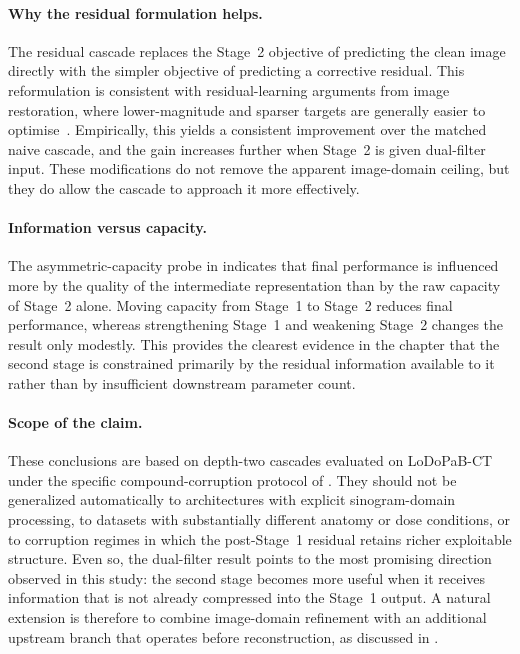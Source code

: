 \paragraph{Why the residual formulation helps.}
The residual cascade replaces the Stage~2 objective of predicting the clean image directly with the simpler objective of predicting a corrective residual. This reformulation is consistent with residual-learning arguments from image restoration, where lower-magnitude and sparser targets are generally easier to optimise~\cite{Zhang2017}. Empirically, this yields a consistent improvement over the matched naive cascade, and the gain increases further when Stage~2 is given dual-filter input. These modifications do not remove the apparent image-domain ceiling, but they do allow the cascade to approach it more effectively.

\paragraph{Information versus capacity.}
The asymmetric-capacity probe in  indicates that final performance is influenced more by the quality of the intermediate representation than by the raw capacity of Stage~2 alone. Moving capacity from Stage~1 to Stage~2 reduces final performance, whereas strengthening Stage~1 and weakening Stage~2 changes the result only modestly. This provides the clearest evidence in the chapter that the second stage is constrained primarily by the residual information available to it rather than by insufficient downstream parameter count.

\paragraph{Scope of the claim.}
These conclusions are based on depth-two cascades evaluated on LoDoPaB-CT under the specific compound-corruption protocol of . They should not be generalized automatically to architectures with explicit sinogram-domain processing, to datasets with substantially different anatomy or dose conditions, or to corruption regimes in which the post-Stage~1 residual retains richer exploitable structure. Even so, the dual-filter result points to the most promising direction observed in this study: the second stage becomes more useful when it receives information that is not already compressed into the Stage~1 output. A natural extension is therefore to combine image-domain refinement with an additional upstream branch that operates before reconstruction, as discussed in .